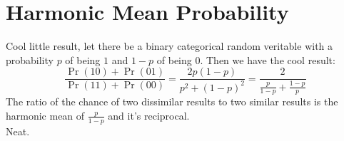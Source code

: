 
\section{Harmonic Mean Probability}
Cool little result,
let there be a binary categorical random veritable with a probability $p$ of being $1$ and $1-p$ of being $0$.
Then we have the cool result:
\[\frac{\Pr(10)+\Pr(01)}{\Pr(11)+\Pr(00)} = \frac{2p(1-p)}{p^2+(1-p)^2} = \frac{2}{\frac{p}{1-p}+\frac{1-p}{p}}\]
The ratio of the chance of two dissimilar results to two similar results is the harmonic mean of $\frac{p}{1-p}$ and it's reciprocal.
\\

Neat.

